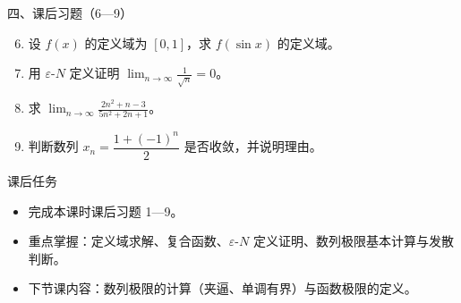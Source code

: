 \documentclass[aspectratio=169,11pt]{beamer}
\begin{document}
\begin{frame}{四、课后习题（6—9）}
\begin{enumerate}\setcounter{enumi}{5}
  \item 设 $f(x)$ 的定义域为 $[0,1]$，求 $f(\sin x)$ 的定义域。
  \item 用 $\varepsilon$-$N$ 定义证明 $\displaystyle\lim_{n\to\infty}\frac{1}{\sqrt{n}}=0$。
  \item 求 $\displaystyle\lim_{n\to\infty}\frac{2n^2+n-3}{5n^2+2n+1}$。
  \item 判断数列 $x_n=\dfrac{1+(-1)^n}{2}$ 是否收敛，并说明理由。
\end{enumerate}
\end{frame}

\begin{frame}{课后任务}
\begin{itemize}
  \item 完成本课时课后习题 1—9。
  \item 重点掌握：定义域求解、复合函数、$\varepsilon$-$N$ 定义证明、数列极限基本计算与发散判断。
  \item 下节课内容：数列极限的计算（夹逼、单调有界）与函数极限的定义。
\end{itemize}
\end{frame}
\end{document}
